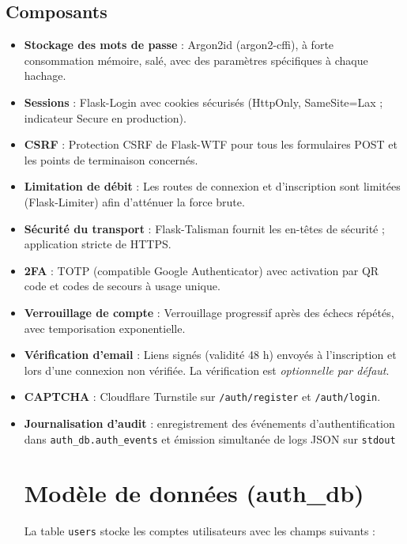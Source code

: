 \subsection{Composants}
\begin{itemize}
  \item \textbf{Stockage des mots de passe} : Argon2id (argon2-cffi), à forte consommation mémoire, salé, avec des paramètres spécifiques à chaque hachage.
  \item \textbf{Sessions} : Flask-Login avec cookies sécurisés (HttpOnly, SameSite=Lax ; indicateur Secure en production).
  \item \textbf{CSRF} : Protection CSRF de Flask-WTF pour tous les formulaires POST et les points de terminaison concernés.
  \item \textbf{Limitation de débit} : Les routes de connexion et d'inscription sont limitées (Flask-Limiter) afin d'atténuer la force brute.
  \item \textbf{Sécurité du transport} : Flask-Talisman fournit les en-têtes de sécurité ; application stricte de HTTPS.
  \item \textbf{2FA} : TOTP (compatible Google Authenticator) avec activation par QR code et codes de secours à usage unique.
  \item \textbf{Verrouillage de compte} : Verrouillage progressif après des échecs répétés, avec temporisation exponentielle.
  \item \textbf{Vérification d'email} : Liens signés (validité 48 h) envoyés à l'inscription et lors d'une connexion non vérifiée. La vérification est \emph{optionnelle par défaut}.
  \item \textbf{CAPTCHA} : Cloudflare Turnstile sur \texttt{/auth/register} et \texttt{/auth/login}.
  \item \textbf{Journalisation d'audit} : enregistrement des événements d'authentification dans \texttt{auth\_db.auth\_events} et émission simultanée de logs JSON sur \texttt{stdout}

\section{Modèle de données (auth\_db)}
La table \texttt{users} stocke les comptes utilisateurs avec les champs suivants :


\end{itemize}
